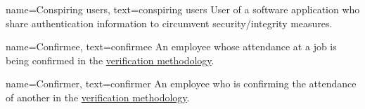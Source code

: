 {
  name={Conspiring users},
  text={conspiring users}
}
{
  User of a software application who share authentication
  information to circumvent security/integrity measures.
}

{
  name={Confirmee},
  text={confirmee}
}
{
  An employee whose attendance at a job is being confirmed
  in the \hyperref[s:concept]{verification methodology}.
}

{
  name={Confirmer},
  text={confirmer}
}
{
  An employee who is confirming the attendance of another
  in the \hyperref[s:concept]{verification methodology}.
}